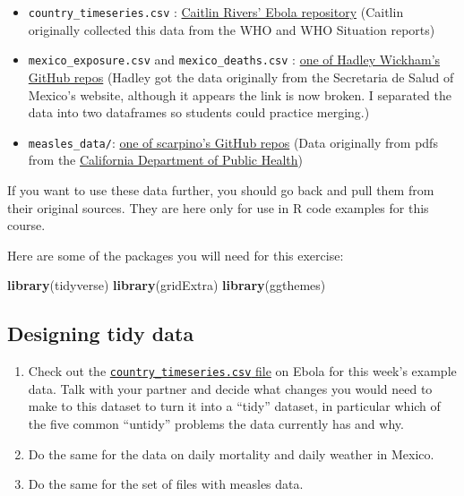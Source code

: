 \documentclass[]{book}
\makeatletter
\newenvironment{Shaded}{\begin{snugshade}}{\end{snugshade}}
\newcommand{\KeywordTok}[1]{\textcolor[rgb]{0.13,0.29,0.53}{\textbf{{#1}}}}
\newcommand{\NormalTok}[1]{{#1}}
\providecommand{\tightlist}{%
  \setlength{\itemsep}{0pt}\setlength{\parskip}{0pt}}
\newenvironment{kframe}{%
\medskip{}
\setlength{\fboxsep}{.8em}
 \def\at@end@of@kframe{}%
 \ifinner\ifhmode%
  \def\at@end@of@kframe{\end{minipage}}%
  \begin{minipage}{\columnwidth}%
 \fi\fi%
 \def\FrameCommand##1{\hskip\@totalleftmargin \hskip-\fboxsep
 \colorbox{shadecolor}{##1}\hskip-\fboxsep
     \hskip-\linewidth \hskip-\@totalleftmargin \hskip\columnwidth}%
 \MakeFramed {\advance\hsize-\width
   \@totalleftmargin\z@ \linewidth\hsize
   \@setminipage}}%
 {\par\unskip\endMakeFramed%
 \at@end@of@kframe}
\renewenvironment{Shaded}{\begin{kframe}}{\end{kframe}}
\newenvironment{rmdblock}[1]
  {
  \begin{itemize}
  \renewcommand{\labelitemi}{
    \raisebox{-.7\height}[0pt][0pt]{
      {\setkeys{Gin}{width=3em,keepaspectratio}\texttt{[image: images/\#1]}}
    }
  }
  \setlength{\fboxsep}{1em}
  \begin{kframe}
  \item
  }
  {
  \end{kframe}
  \end{itemize}
  }
\newenvironment{rmdwarning}
  {\begin{rmdblock}{warning}}
  {\end{rmdblock}}
\makeatother
\begin{document}
\begin{itemize}
\tightlist
\item
  \texttt{country\_timeseries.csv} :
  \href{https://github.com/cmrivers/ebola}{Caitlin Rivers' Ebola
  repository} (Caitlin originally collected this data from the WHO and
  WHO Situation reports)
\item
  \texttt{mexico\_exposure.csv} and \texttt{mexico\_deaths.csv} :
  \href{https://github.com/hadley/mexico-mortality/tree/master/disease}{one
  of Hadley Wickham's GitHub repos} (Hadley got the data originally from
  the Secretaria de Salud of Mexico's website, although it appears the
  link is now broken. I separated the data into two dataframes so
  students could practice merging.)
\item
  \texttt{measles\_data/}:
  \href{https://github.com/scarpino/measles-CA-2015}{one of scarpino's
  GitHub repos} (Data originally from pdfs from the
  \href{https://www.cdph.ca.gov/HealthInfo/discond/Pages/MeaslesSurveillanceUpdates.aspx}{California
  Department of Public Health})
\end{itemize}

\begin{rmdwarning}
If you want to use these data further, you should go back and pull them
from their original sources. They are here only for use in R code
examples for this course.
\end{rmdwarning}

Here are some of the packages you will need for this exercise:

\begin{Shaded}
\begin{Highlighting}[]
\KeywordTok{library}\NormalTok{(tidyverse)}
\KeywordTok{library}\NormalTok{(gridExtra)}
\KeywordTok{library}\NormalTok{(ggthemes)}
\end{Highlighting}
\end{Shaded}

\subsection{Designing tidy data}\label{designing-tidy-data}

\begin{enumerate}
\def\labelenumi{\arabic{enumi}.}
\tightlist
\item
  Check out the
  \href{https://github.com/geanders/RProgrammingForResearch/raw/master/data/country_timeseries.csv}{\texttt{country\_timeseries.csv}
  file} on Ebola for this week's example data. Talk with your partner
  and decide what changes you would need to make to this dataset to turn
  it into a ``tidy'' dataset, in particular which of the five common
  ``untidy'' problems the data currently has and why.
\item
  Do the same for the data on daily mortality and daily weather in
  Mexico.
\item
  Do the same for the set of files with measles data.
\end{enumerate}
\end{document}
